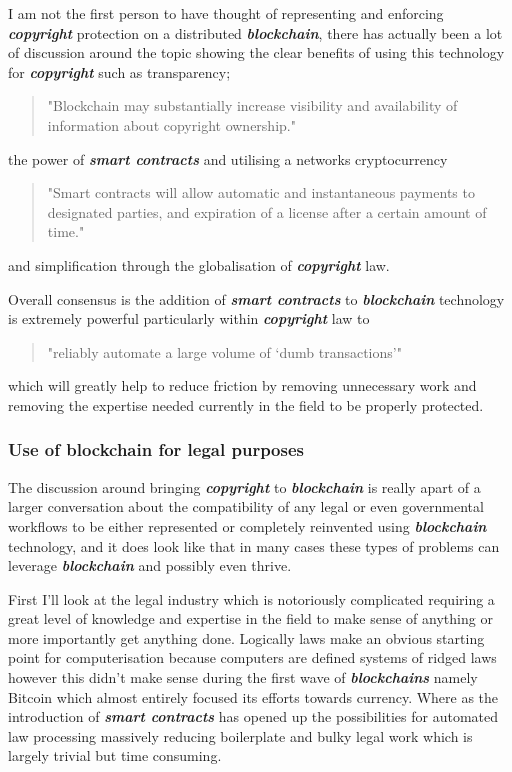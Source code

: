 \documentclass[12pt]{article}
\newcommand{\keyword}[1]{\textbf{\textit{#1}}}
\begin{document}
I am not the first person to have thought of representing and enforcing \keyword{copyright} protection on a distributed \keyword{blockchain}, there has actually been a lot of discussion around the topic showing the clear benefits of using this technology for \keyword{copyright} such as transparency; \begin{quote} "Blockchain may substantially increase visibility and availability of information about copyright ownership." \cite{Copyright_in_the_blockchain_era} \end{quote} the power of \keyword{smart contracts} and utilising a networks cryptocurrency \begin{quote} "Smart contracts will allow automatic and instantaneous payments to designated parties, and expiration of a license after a certain amount of time." \cite{Copyright_in_the_blockchain_era} \end{quote} and simplification through the globalisation of \keyword{copyright} law.

Overall consensus is the addition of \keyword{smart contracts} to \keyword{blockchain} technology is extremely powerful particularly within \keyword{copyright} law to \begin{quote}"reliably automate a large volume of ‘dumb transactions’" \cite{missing_link_in_copyright_licensing}\end{quote} which will greatly help to reduce friction by removing unnecessary work and removing the expertise needed currently in the field to be properly protected.

\subsubsection{Use of blockchain for legal purposes}

The discussion around bringing \keyword{copyright} to \keyword{blockchain} is really apart of a larger conversation about the compatibility of any legal or even governmental workflows to be either represented or completely reinvented using \keyword{blockchain} technology, and it does look like that in many cases these types of problems can leverage \keyword{blockchain} and possibly even thrive.

First I'll look at the legal industry which is notoriously complicated requiring a great level of knowledge and expertise in the field to make sense of anything or more importantly get anything done. Logically laws make an obvious starting point for computerisation because computers are defined systems of ridged laws however this didn't make sense during the first wave of \keyword{blockchains} namely Bitcoin which almost entirely focused its efforts towards currency. Where as the introduction of \keyword{smart contracts} has opened up the possibilities for automated law processing massively reducing boilerplate and bulky legal work which is largely trivial but time consuming.
\end{document}
